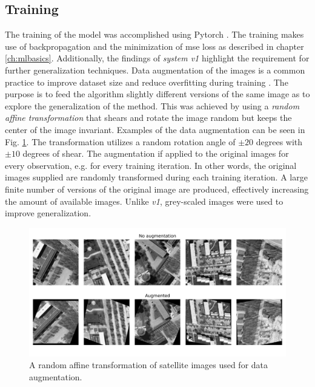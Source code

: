 \subsection{Training}\label{sec:training_v2}
The training of the model was accomplished using Pytorch \cite{Paszke2017AutomaticPyTorch}. The training makes use of backpropagation and the minimization of \gls{mse} loss as described in chapter \ref{ch:mlbasics}. Additionally, the findings of \emph{system v1} highlight the requirement for further generalization techniques. Data augmentation of the images is a common practice to improve dataset size and reduce overfitting during training \cite{Shorten2019ALearning}. The purpose is to feed the algorithm slightly different versions of the same image as to explore the generalization of the method. This was achieved by using a \emph{random  affine  transformation} that shears and rotate the image random but keeps the center of the image invariant. Examples of the data augmentation can be seen in Fig. \ref{fig:data_augmentation}. The transformation utilizes a random rotation angle of $\pm 20$ degrees with $\pm 10$ degrees of shear. The augmentation if applied to the original images for every observation, e.g. for every training iteration. In other words, the original images supplied are randomly transformed during each training iteration. A large finite number of versions of the original image are produced, effectively increasing the amount of available images. Unlike \emph{v1}, grey-scaled images were used to improve generalization. 


\begin{figure}
    \centering
    \includegraphics{chapters/part_pathloss/model_aided_paper/data_augmentation.png}
    \caption{A random affine transformation of satellite images used for data augmentation.}
    \label{fig:data_augmentation}
\end{figure}

